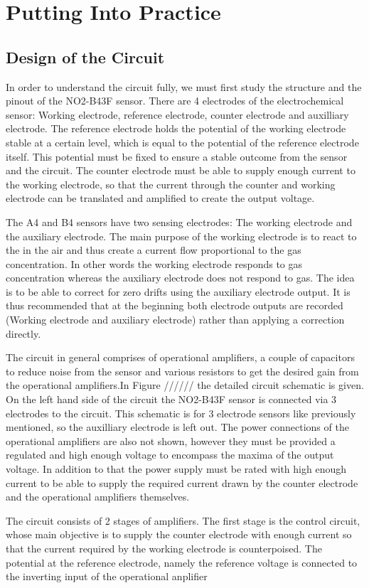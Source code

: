 \chapter{Putting Into Practice}

\section{Design of the Circuit}

In order to understand the circuit fully, we must first study the structure and the pinout of the NO2-B43F sensor. There are 4 electrodes of the electrochemical sensor: Working electrode, reference electrode, counter electrode and auxilliary electrode. The reference electrode holds the potential of the working electrode stable at a certain level, which is equal to the potential of the reference electrode itself. This potential must be fixed to ensure a stable outcome from the sensor and the circuit. The counter electrode must be able to supply enough current to the working electrode, so that the current through the counter and working electrode can be translated and amplified to create the output voltage.\par
The A4 and B4 sensors have two sensing electrodes: The working electrode and the auxiliary electrode. The main purpose of the working electrode is to react to the  in the air and thus create a current flow proportional to the gas concentration. In other words the working electrode responds to gas concentration whereas the auxiliary electrode does not respond to gas. The idea is to be able to correct for zero drifts using the auxiliary electrode output. It is thus recommended that at the beginning both electrode outputs are recorded (Working electrode and auxiliary electrode) rather than applying a correction directly.\par
The circuit in general comprises of operational amplifiers, a couple of capacitors to reduce noise from the sensor and various resistors to get the desired gain from the operational amplifiers.In Figure ////// the detailed circuit schematic is given. On the left hand side of the circuit the NO2-B43F sensor is connected via 3 electrodes to the circuit. This schematic is for 3 electrode sensors like previously mentioned, so the auxilliary electrode is left out. The power connections of the operational amplifiers are also not shown, however they must be provided a regulated and high enough voltage to encompass the maxima of the output voltage. In addition to that the power supply must be rated with high enough current to be able to supply the required current drawn by the counter electrode and the operational amplifiers themselves.\par
The circuit consists of 2 stages of amplifiers. The first stage is the control circuit, whose main objective is to supply the counter electrode with enough current so that the current required by the working electrode is counterpoised. The potential at the reference electrode, namely the reference voltage is connected to the inverting input of the operational anplifier

